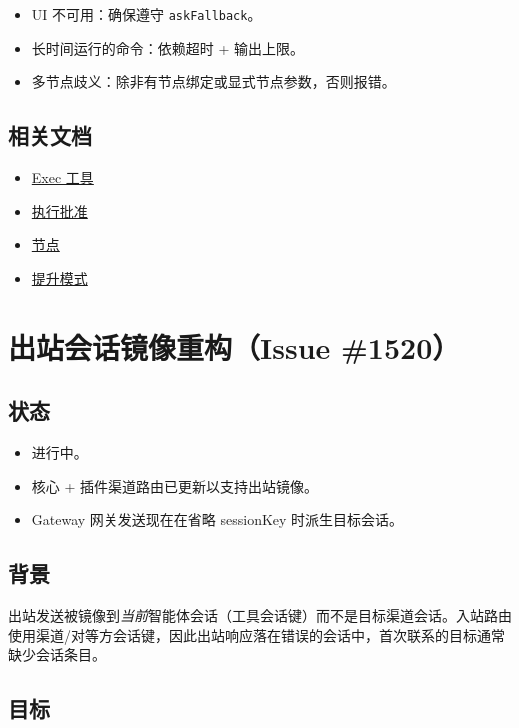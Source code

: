 \begin{itemize}
  \item UI 不可用：确保遵守 \texttt{askFallback}。
  \item 长时间运行的命令：依赖超时 + 输出上限。
  \item 多节点歧义：除非有节点绑定或显式节点参数，否则报错。
\end{itemize}


\subsection{相关文档}


\begin{itemize}
  \item \href{/tools/exec}{Exec 工具}
  \item \href{/tools/exec-approvals}{执行批准}
  \item \href{/nodes}{节点}
  \item \href{/tools/elevated}{提升模式}
\end{itemize}



\clearpage

\section{出站会话镜像重构（Issue \#1520）}


\subsection{状态}


\begin{itemize}
  \item 进行中。
  \item 核心 + 插件渠道路由已更新以支持出站镜像。
  \item Gateway 网关发送现在在省略 sessionKey 时派生目标会话。
\end{itemize}


\subsection{背景}


出站发送被镜像到\textit{当前}智能体会话（工具会话键）而不是目标渠道会话。入站路由使用渠道/对等方会话键，因此出站响应落在错误的会话中，首次联系的目标通常缺少会话条目。

\subsection{目标}


